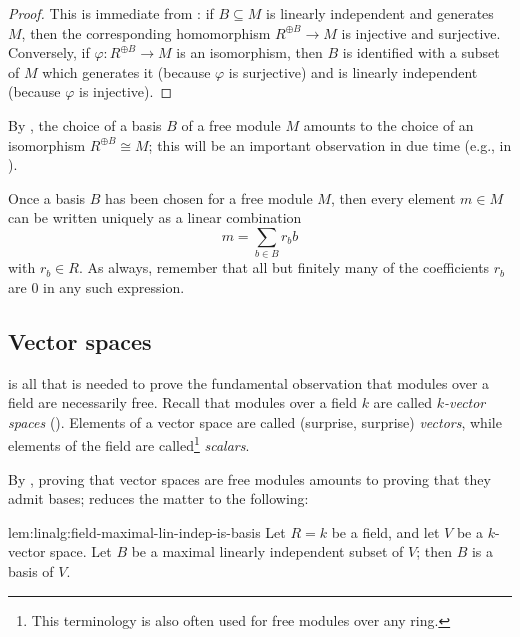 \begin{proof}
  This is immediate from : if $B \subseteq M$ is
  linearly independent and generates $M$, then the corresponding
  homomorphism $R^{\oplus B} \to M$ is injective and
  surjective. Conversely, if $\varphi : R^{\oplus B} \to M$ is an
  isomorphism, then $B$ is identified with a subset of $M$ which
  generates it (because $\varphi$ is surjective) and is linearly
  independent (because $\varphi$ is injective).
\end{proof}
By , the choice of a basis $B$ of a free module $M$
amounts to the choice of an isomorphism $R^{\oplus B} \cong M$; this
will be an important observation in due time (e.g., in
).

Once a basis $B$ has been chosen for a free module $M$, then every
element $m \in M$ can be written uniquely as a linear combination
\[m = \sum_{b \in B} r_b b\] with $r_b \in R$. As always, remember
that all but finitely many of the coefficients $r_b$ are $0$ in any
such expression.

\subsection{Vector spaces}
\label{subsec:linalg:vector-spaces}
 is all that is needed to prove the fundamental
observation that modules over a field are necessarily free. Recall
that modules over a field $k$ are called \emph{$k$-vector spaces}
(). Elements of a vector space are called
(surprise, surprise) \emph{vectors}, while elements of the field are
called\footnote{This terminology is also often used for free modules
  over any ring.}  \emph{scalars}.

By , proving that vector spaces are free modules
amounts to proving that they admit bases;  reduces
the matter to the following:

\begin{lem}{}{lem:linalg:field-maximal-lin-indep-is-basis}
  Let $R = k$ be a field, and let $V$ be a $k$-vector space. Let $B$
  be a maximal linearly independent subset of $V$; then $B$ is a basis
  of $V$.
\end{lem}

